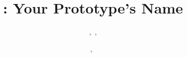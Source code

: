 \documentclass[10pt,journal]{IEEEtran}
\begin{document}
\title{\Large \bf {\tech}: Your Prototype's Name}

\author{
  \authorAname,~,
  \and
  \authorBname,~
}

\maketitle



\begin{IEEEkeywords}
\paperkeywords
\end{IEEEkeywords}













\appendixcontent

\end{document}
